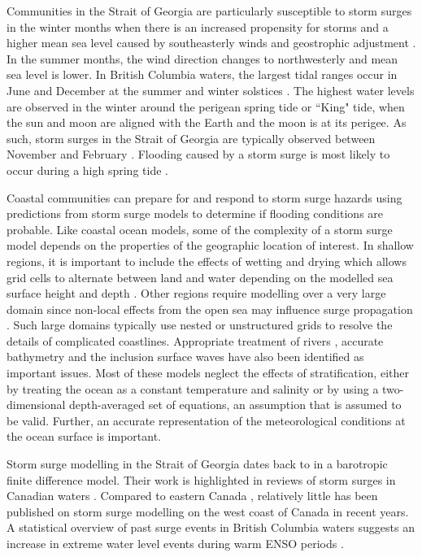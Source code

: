 \documentclass[pdftex,10pt]{article}
\begin{document}
Communities in the Strait of Georgia are particularly susceptible to storm surges in the winter months when there is an increased propensity for storms and a higher mean sea level caused by southeasterly winds and geostrophic adjustment \citep{danard2003storm}. In the summer months, the wind direction changes to northwesterly and mean sea level is lower. In British Columbia waters, the largest tidal ranges occur in June and December at the summer and winter solstices \citep{thomson1981oceanography}. The highest water levels are observed in the winter around the perigean spring tide or ``King" tide, when the sun and moon are aligned with the Earth and the moon is at its perigee. As such, storm surges in the Strait of Georgia are typically observed between November and February \citep{forseth2006adaptation}. Flooding caused by a storm surge is most likely to occur during a high spring tide \citep{abeys2011extreme}. 

Coastal communities can prepare for and respond to storm surge hazards using predictions from storm surge models to determine if flooding conditions are probable. Like coastal ocean models, some of the complexity of a storm surge model depends on the properties of the geographic location of interest. In shallow regions, it is important to include the effects of wetting and drying which allows grid cells to alternate between land and water depending on the modelled sea surface height and depth \citep{hubbert1999storm, weisberg2006hurricane}.  Other regions require modelling over a very large domain since non-local effects from the open sea may influence surge propagation \citep{weisberg2006hurricane, lane2009verification}. Such large domains typically use nested or unstructured grids to resolve the details of complicated coastlines. Appropriate treatment of rivers \citep{flather1994storm}, accurate bathymetry and the inclusion surface waves \citep{xu2010storm} have also been identified as important issues.  Most of these models neglect the effects of stratification, either by treating the ocean as a constant temperature and salinity or by using a two-dimensional depth-averaged set of equations, an assumption that is assumed to be valid. Further, an accurate representation of the meteorological conditions at the ocean surface is important.

Storm surge modelling in the Strait of Georgia dates back to \citet{crean1988mathematical} in a barotropic finite difference model. Their work is highlighted in reviews of storm surges in Canadian waters \citep{murty1995storm, danard2003storm}.  Compared to eastern Canada \citep{gray1984preliminary, bernier2006predicting,bobanovic2006forecasting, bernier2007tide, bernier2010tide}, relatively little has been published on storm surge modelling on the west coast of Canada in recent years. A statistical overview of past surge events in British Columbia waters suggests an increase in extreme water level events during warm ENSO periods \citep{abeys2011extreme}.
\end{document}
